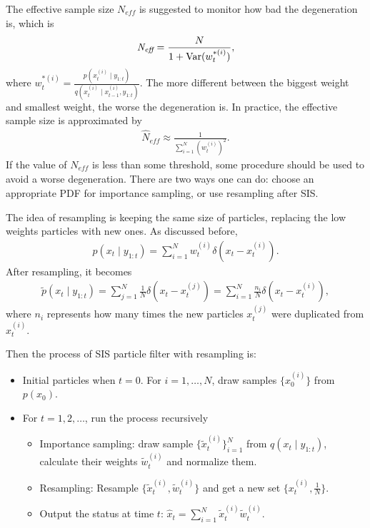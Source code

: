 The effective sample size $\textit{N}_{\textit{eff}}$ is suggested to monitor how bad the degeneration is, which is
\begin{align*}
\textit{N}_{\textit{eff}}=\frac{N}{1+\mathrm{Var}(w_t ^{*(i)})},
\end{align*}
where $w_t ^{*(i)}=\frac{p(x_t ^{(i)}\mid y_{1:t})}{q(x_t ^{(i)}\mid x_{t-1}^{(i)},y_{1:t})}$. The more different between the biggest weight and smallest weight, the worse the degeneration is. In practice, the effective sample size is approximated by
\begin{align*}
\hat{N}_{\textit{eff}}\approx \frac{1}{\sum_{i=1}^{N}(w_t ^{(i)})^2}.
\end{align*}
If the value of $\textit{N}_{\textit{eff}}$ is less than some threshold, some procedure should be used to avoid a worse degeneration. There are two ways one can do: choose an appropriate PDF for importance sampling, or use resampling after SIS. 

The idea of resampling is keeping the same size of particles, replacing the low weights particles with new ones. As discussed before, 
\begin{align*}
p(x_t \mid y_{1:t})=\sum_{i=1}^Nw_t ^{(i)} \delta (x_t -x_t ^{(i)}).
\end{align*}
After resampling, it becomes
\begin{align*}
\tilde{p}(x_t \mid y_{1:t})=\sum_{j=1}^N\frac{1}{N} \delta (x_t -x_t ^{(j)})= \sum_{i=1}^N\frac{n_i}{N} \delta (x_t -x_t ^{(i)}),
\end{align*}
where $n_i$ represents how many times the new particles $x_t ^{(j)}$ were duplicated from$x_t ^{(i)}$. 

Then the process of SIS particle filter with resampling is:
\begin{itemize}
\item Initial particles when $t=0$. For $i=1, \dots, N$, draw samples $\{x_0^{(i)}\}$ from $p(x_0)$.
\item For $t=1,2,\dots$, run the process recursively
\begin{itemize}
\item Importance sampling: draw sample $\{\tilde{x}_t ^{(i)}\}_{i=1}^N$ from $q(x_t \mid y_{1:t})$, calculate their weights $\tilde{w}_t ^{(i)}$ and normalize them.
\item Resampling: Resample $\{\tilde{x}_t ^{(i)}, \tilde{w}_t ^{(i)}\}$ and get a new set $\{x_t ^{(i)},\frac{1}{N}\}$.
\item Output the status at time $t$: $\hat{x}_t =\sum_{i=1}^{N}\tilde{x}_t ^{(i)}\tilde{w}_t ^{(i)}$.
\end{itemize}
\end{itemize}

